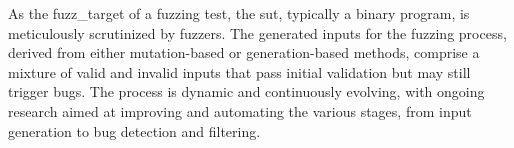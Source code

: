 As the \gls{fuzz_target} of a fuzzing test, the \acrshort{sut}, typically a binary program,
is meticulously scrutinized by fuzzers. The generated inputs for the fuzzing process,
derived from either mutation-based or generation-based methods, comprise a mixture of valid and
invalid inputs that pass initial validation but may still trigger bugs. The process is dynamic
and continuously evolving, with ongoing research aimed at improving and automating the various
stages, from input generation to bug detection and filtering.







